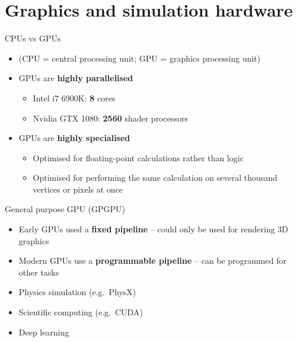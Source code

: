\newcommand\blfootnote[1]{%
  \begingroup
  \renewcommand\thefootnote{}\footnote{#1}%
  \addtocounter{footnote}{-1}%
  \endgroup
}

\part{Graphics and simulation hardware}
\frame{\partpage}

\begin{frame}{CPUs vs GPUs}
	\begin{itemize}
		\item (CPU = central processing unit; GPU = graphics processing unit)
		\pause \item GPUs are \textbf{highly parallelised}
			\begin{itemize}
				\pause \item Intel i7 6900K: \textbf{8} cores
				\pause \item Nvidia GTX 1080: \textbf{2560} shader processors
			\end{itemize}
		\pause \item GPUs are \textbf{highly specialised}
			\begin{itemize}
				\pause \item Optimised for floating-point calculations rather than logic
				\pause \item Optimised for performing the same calculation on several thousand vertices or pixels at once
			\end{itemize}
	\end{itemize}
\end{frame}

\begin{frame}{General purpose GPU (GPGPU)}
	\begin{itemize}
		\item Early GPUs used a \textbf{fixed pipeline} -- could only be used for rendering 3D graphics
		\pause \item Modern GPUs use a \textbf{programmable pipeline} -- can be programmed for other tasks
		\pause \item Physics simulation (e.g.\ PhysX)
		\pause \item Scientific computing (e.g.\ CUDA)
		\pause \item Deep learning
	\end{itemize}
\end{frame}

